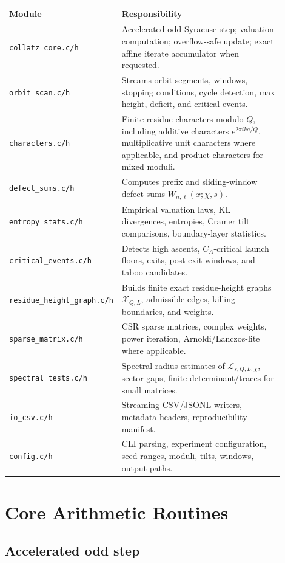 \documentclass[11pt]{article}
\newcommand{\calL}{\mathcal L}
\newcommand{\calX}{\mathcal X}
\begin{document}
\begin{longtable}{p{0.25\linewidth}p{0.65\linewidth}}
\toprule
Module & Responsibility \\
\midrule
\texttt{collatz\_core.c/h} & Accelerated odd Syracuse step; valuation computation; overflow-safe update; exact affine iterate accumulator when requested. \\
\texttt{orbit\_scan.c/h} & Streams orbit segments, windows, stopping conditions, cycle detection, max height, deficit, and critical events. \\
\texttt{characters.c/h} & Finite residue characters modulo \(Q\), including additive characters \(e^{2\pi i k a/Q}\), multiplicative unit characters where applicable, and product characters for mixed moduli. \\
\texttt{defect\_sums.c/h} & Computes prefix and sliding-window defect sums \(W_{n,\ell}(x;\chi,s)\). \\
\texttt{entropy\_stats.c/h} & Empirical valuation laws, KL divergences, entropies, Cramer tilt comparisons, boundary-layer statistics. \\
\texttt{critical\_events.c/h} & Detects high ascents, \(C_A\)-critical launch floors, exits, post-exit windows, and taboo candidates. \\
\texttt{residue\_height\_graph.c/h} & Builds finite exact residue-height graphs \(\calX_{Q,L}\), admissible edges, killing boundaries, and weights. \\
\texttt{sparse\_matrix.c/h} & CSR sparse matrices, complex weights, power iteration, Arnoldi/Lanczos-lite where applicable. \\
\texttt{spectral\_tests.c/h} & Spectral radius estimates of \(\calL_{s,Q,L,\chi}\), sector gaps, finite determinant/traces for small matrices. \\
\texttt{io\_csv.c/h} & Streaming CSV/JSONL writers, metadata headers, reproducibility manifest. \\
\texttt{config.c/h} & CLI parsing, experiment configuration, seed ranges, moduli, tilts, windows, output paths. \\
\bottomrule
\end{longtable}

\section{Core Arithmetic Routines}

\subsection{Accelerated odd step}
\end{document}
